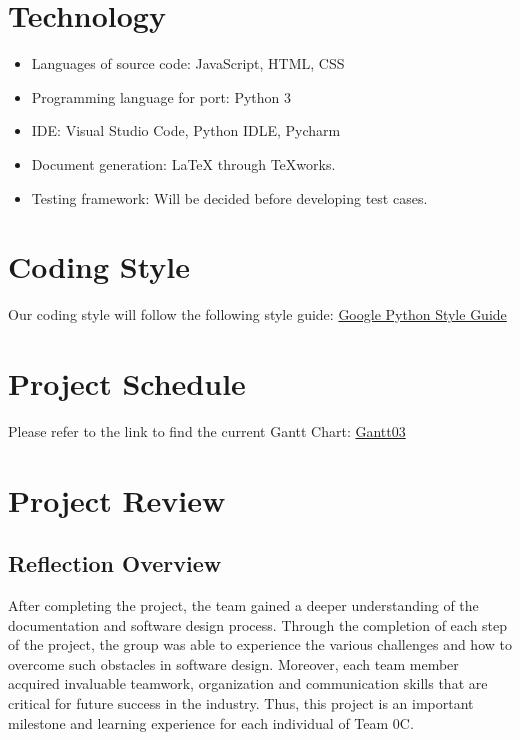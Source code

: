 \documentclass{article}
\begin{document}
\section{Technology}
\begin{itemize}
\item Languages of source code: JavaScript, HTML, CSS
\item Programming language for port: Python 3
\item IDE: Visual Studio Code, Python IDLE, Pycharm
\item Document generation: LaTeX through TeXworks.
\item Testing framework: Will be  decided before developing test cases.

\end{itemize}
\section{Coding Style}
Our coding style will follow the following style guide:\color{blue} 
\href{https://google.github.io/styleguide/pyguide.html}{ Google Python Style Guide} 

\color{black}
\section{Project Schedule}

Please refer to the link to find the current Gantt Chart:
\color{blue}
\href{https://gitlab.cas.mcmaster.ca/liangw15/3XA3Project/blob/master/Doc/DevelopmentPlan/Group12_Gantt03.pdf}{ Gantt03}
\color{black}

\section{Project Review}
\color{blue}
\subsection{Reflection Overview}
\hspace{5mm}
After completing the project, the team gained a deeper understanding of the documentation and software design process. Through the completion of each step of the project, the group was able to experience the various challenges and how to overcome such obstacles in software design. Moreover, each team member acquired invaluable teamwork, organization and communication skills that are critical for future success in the industry. Thus, this project is an important milestone and learning experience for each individual of Team 0C.
\end{document}
